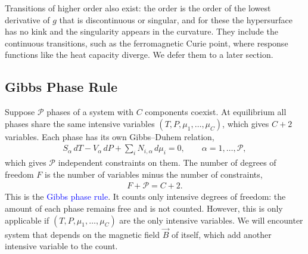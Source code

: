 Transitions of higher order also exist: the order is the order of the lowest
derivative of $g$ that is discontinuous or singular, and for these the
hypersurface has no kink and the singularity appears in the curvature. They
include the continuous transitions, such as the ferromagnetic Curie point, where
response functions like the heat capacity diverge. We defer them to a later
section.

\subsection{Gibbs Phase Rule}

    Suppose $\mathcal{P}$ phases of a system with $C$ components coexist. At
    equilibrium all phases share the same intensive variables
    $(T,P,\mu_1,\dots,\mu_C)$, which gives $C+2$ variables. Each phase has its
    own Gibbs--Duhem relation,
    \begin{align*}
        S_\alpha\,dT - V_\alpha\,dP + \sum_i N_{i,\alpha}\,d\mu_i = 0,
        \qquad \alpha = 1,\dots,\mathcal{P},
    \end{align*}
    which gives $\mathcal{P}$ independent constraints on them. The number of
    degrees of freedom $F$ is the number of variables minus the number of
    constraints,
    \begin{align}
        \boxed{F+\mathcal{P}=C+2.}
    \end{align}
    This is the \textcolor{blue}{Gibbs phase rule}. It counts only intensive
    degrees of freedom: the amount of each phase remains free and is not counted. However, this is only applicable if $(T,P,\mu_1,\dots,\mu_C)$ are the only intensive variables. We will encounter system that depends on the magnetic field $\vec B$ of itself, which add another intensive variable to the count.

